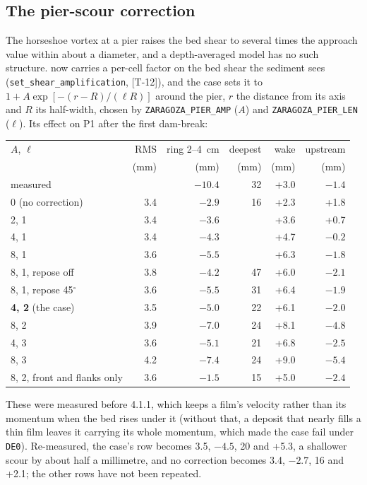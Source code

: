 \subsection*{The pier-scour correction}

The horseshoe vortex at a pier raises the bed shear to several times the
approach value within about a diameter, and a depth-averaged model has no
such structure. \anuga{} now carries a per-cell factor on the bed shear the
sediment sees (\texttt{set\_shear\_amplification}, [T-12]), and the case
sets it to $1 + A \exp[-(r - R)/(\ell R)]$ around the pier, $r$ the
distance from its axis and $R$ its half-width, chosen by
\texttt{ZARAGOZA\_PIER\_AMP} ($A$) and \texttt{ZARAGOZA\_PIER\_LEN} ($\ell$).
Its effect on P1 after the first dam-break:

\begin{center}
\footnotesize
\setlength{\tabcolsep}{3pt}
\begin{tabular}{p{3.0cm}rrrrr}
\hline
$A$, $\ell$ & RMS & ring 2--4~cm & deepest & wake & upstream \\
 & (mm) & (mm) & (mm) & (mm) & (mm) \\
\hline
measured & & $-10.4$ & 32 & +3.0 & $-1.4$ \\
0 (no correction) & 3.4 & $-2.9$ & 16 & +2.3 & +1.8 \\
2, 1 & 3.4 & $-3.6$ & & +3.6 & +0.7 \\
4, 1 & 3.4 & $-4.3$ & & +4.7 & $-0.2$ \\
8, 1 & 3.6 & $-5.5$ & & +6.3 & $-1.8$ \\
8, 1, repose off & 3.8 & $-4.2$ & 47 & +6.0 & $-2.1$ \\
8, 1, repose 45$^\circ$ & 3.6 & $-5.5$ & 31 & +6.4 & $-1.9$ \\
\textbf{4, 2} (the case) & 3.5 & $-5.0$ & 22 & +6.1 & $-2.0$ \\
8, 2 & 3.9 & $-7.0$ & 24 & +8.1 & $-4.8$ \\
4, 3 & 3.6 & $-5.1$ & 21 & +6.8 & $-2.5$ \\
8, 3 & 4.2 & $-7.4$ & 24 & +9.0 & $-5.4$ \\
8, 2, front and flanks only & 3.6 & $-1.5$ & 15 & +5.0 & $-2.4$ \\
\hline
\end{tabular}
\end{center}

These were measured before \anuga{} 4.1.1, which keeps a film's velocity
rather than its momentum when the bed rises under it (without that, a
deposit that nearly fills a thin film leaves it carrying its whole momentum,
which made the case fail under \texttt{DE0}). Re-measured, the case's row
becomes 3.5, $-4.5$, 20 and +5.3, a shallower scour by about half a
millimetre, and no correction becomes 3.4, $-2.7$, 16 and +2.1; the other
rows have not been repeated.

